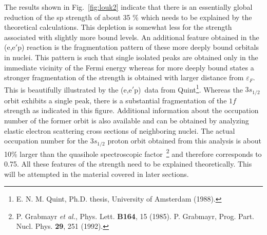 The results shown in Fig.~\ref{fig:louk2} indicate that there is an
essentially global reduction of the sp strength of about
35 \% 
which needs to be explained by the theoretical calculations.
This depletion is somewhat less for the strength associated with slightly
more bound levels.
An additional feature obtained in the (e,e$'$p) reaction is the fragmentation
pattern of these more deeply bound orbitals in nuclei.
This pattern is such that single isolated peaks are obtained only
in the immediate vicinity
of the Fermi energy whereas for more deeply bound states a stronger
fragmentation of the strength is obtained with larger distance from
$\varepsilon_F$.
This is beautifully illustrated by the (e,e$'$p)\ data from 
Quint\footnote{E. N. M. Quint, Ph.D. thesis, University of Amsterdam (1988).}.
Whereas the $3s_{1/2}$ orbit exhibits a single peak, there is a
substantial fragmentation of the $1f$ strength as indicated in 
this figure.
Additional information about the occupation number of the former orbit 
is also available and can be 
obtained by analyzing elastic electron scattering cross sections of 
neighboring nuclei.
The actual occupation number for the $3s_{1/2}$ proton orbit obtained
from this analysis is about 10\% 
larger than the quasihole spectroscopic
factor~\footnote{P. Grabmayr \textit{et al.}, Phys. Lett. {\bf B164}, 15 (1985). 
P. Grabmayr, Prog. Part. Nucl. Phys. {\bf 29}, 251 (1992).} and therefore corresponds to 0.75.
All these features of the strength need to be explained theoretically.
This will be attempted in the material covered in later sections.


